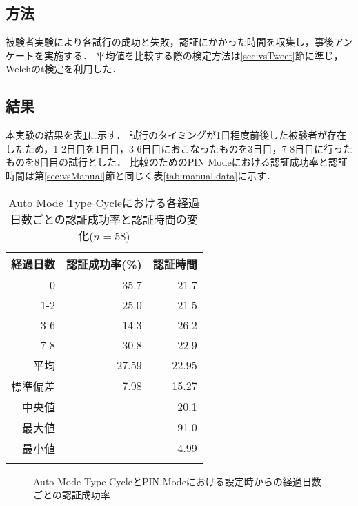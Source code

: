 \subsection{方法}
被験者実験により各試行の成功と失敗，認証にかかった時間を収集し，事後アンケートを実施する．
平均値を比較する際の検定方法は\ref{sec:vsTweet}節に準じ，Welchのt検定を利用した．

\subsection{結果}
本実験の結果を表\ref{tab:auto_cycle.data}に示す．
試行のタイミングが1日程度前後した被験者が存在したため，1-2日目を1日目，3-6日目におこなったものを3日目，7-8日目に行ったものを8日目の試行とした．
比較のためのPIN Modeにおける認証成功率と認証時間は第\ref{sec:vsManual}節と同じく表\ref{tab:manual.data}に示す．
\begin{table}[ht]
  \caption{Auto Mode Type Cycleにおける各経過日数ごとの認証成功率と認証時間の変化($ n = 58 $)}
  \label{tab:auto_cycle.data}
  \begin{center}
    \small
    \begin{tabular}{rrr}
      \bhline
      経過日数 & 認証成功率(\%) & 認証時間\\ \hline
      0   & 35.7 & 21.7 \\
      1-2 & 25.0 & 21.5 \\
      3-6 & 14.3 & 26.2 \\
      7-8 & 30.8 & 22.9 \\ \hline \hline
      平均 & 27.59 & 22.95 \\
      標準偏差 & 7.98 & 15.27 \\
      中央値   & & 20.1 \\
      最大値   & & 91.0 \\
      最小値   & & 4.99 \\
      \bhline
    \end{tabular}
  \end{center}
\end{table}

\begin{figure}[t]
  \begin{center}
  \end{center}
  \caption{Auto Mode Type CycleとPIN Modeにおける設定時からの経過日数ごとの認証成功率}
  \label{fig:ex_auto_cycle_vs_pin_rate}
\end{figure}

